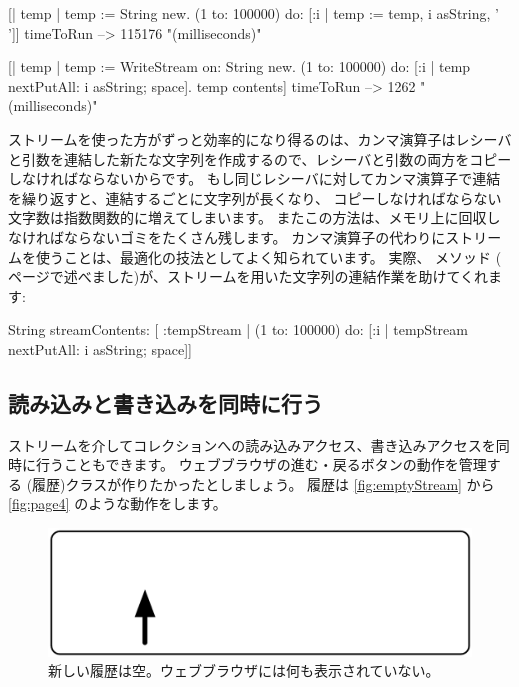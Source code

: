 \documentclass[a4paper,10pt,twoside]{book}
\begin{document}
\begin{code}{}
[| temp |
  temp := String new.
  (1 to: 100000)
    do: [:i | temp := temp, i asString, ' ']] timeToRun --> 115176 "(milliseconds)"

[| temp |
  temp := WriteStream on: String new.
  (1 to: 100000)
    do: [:i | temp nextPutAll: i asString; space].
  temp contents] timeToRun --> 1262 "(milliseconds)"
\end{code}

ストリームを使った方がずっと効率的になり得るのは、カンマ演算子はレシーバと引数を連結した新たな文字列を作成するので、レシーバと引数の両方をコピーしなければならないからです。
もし同じレシーバに対してカンマ演算子で連結を繰り返すと、連結するごとに文字列が長くなり、
コピーしなければならない文字数は指数関数的に増えてしまいます。%
またこの方法は、メモリ上に回収しなければならないゴミをたくさん残します。
カンマ演算子の代わりにストリームを使うことは、最適化の技法としてよく知られています。
実際、 メソッド (\pageref{sec:streamContents} ページで述べました)が、ストリームを用いた文字列の連結作業を助けてくれます:

\begin{code}{}
String streamContents: [ :tempStream |
  (1 to: 100000)
       do: [:i | tempStream nextPutAll: i asString; space]] 
\end{code}

\subsection{読み込みと書き込みを同時に行う}

ストリームを介してコレクションへの読み込みアクセス、書き込みアクセスを同時に行うこともできます。
ウェブブラウザの進む・戻るボタンの動作を管理する  (履歴)クラスが作りたかったとしましょう。
履歴は \ref{fig:emptyStream} から \ref{fig:page4} のような動作をします。

\begin{figure}[!ht]
\centerline{\includegraphics[scale=0.5]{emptyStef}}
\caption{新しい履歴は空。ウェブブラウザには何も表示されていない。}
\vspace{.2in}
\end{figure}
\end{document}
